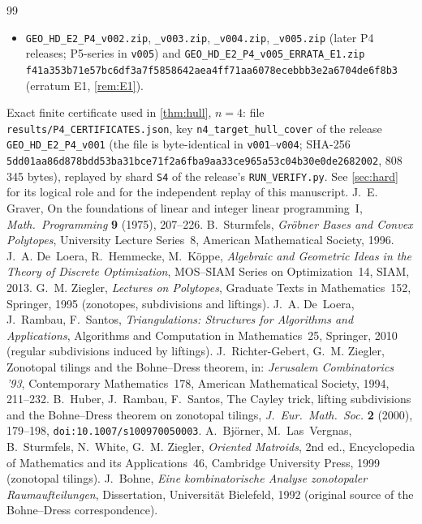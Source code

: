 \begin{thebibliography}{99}
\begin{itemize}[leftmargin=1.4em,itemsep=1pt,topsep=2pt]
\item\texttt{GEO\_HD\_E2\_P4\_v002.zip}, \texttt{\_v003.zip}, \texttt{\_v004.zip}, \texttt{\_v005.zip} (later P4 releases; P5-series in \texttt{v005}) and \texttt{GEO\_HD\_E2\_P4\_v005\_ERRATA\_E1.zip} \texttt{f41a353b71e57bc6df3a7f5858642aea4ff71aa6078ecebbb3e2a6704de6f8b3} (erratum E1, \cref{rem:E1}).
\end{itemize}
 Exact finite certificate used in \cref{thm:hull}, $n=4$: file \texttt{results/P4\_CERTIFICATES.json}, key \texttt{n4\_target\_hull\_cover} of the release \texttt{GEO\_HD\_E2\_P4\_v001} (the file is byte-identical in \texttt{v001}--\texttt{v004}; SHA-256 \texttt{5dd01aa86d878bdd53ba31bce71f2a6fba9aa33ce965a53c04b30e0de2682002}, 808\,345 bytes), replayed by shard \texttt{S4} of the release's \texttt{RUN\_VERIFY.py}. See \cref{sec:hard} for its logical role and for the independent replay of this manuscript.
 J.~E. Graver, On the foundations of linear and integer linear programming~I, \emph{Math.\ Programming} \textbf{9} (1975), 207--226.
 B.~Sturmfels, \emph{Gr\"obner Bases and Convex Polytopes}, University Lecture Series~8, American Mathematical Society, 1996.
 J.~A. De~Loera, R.~Hemmecke, M.~K\"oppe, \emph{Algebraic and Geometric Ideas in the Theory of Discrete Optimization}, MOS--SIAM Series on Optimization~14, SIAM, 2013.
 G.~M. Ziegler, \emph{Lectures on Polytopes}, Graduate Texts in Mathematics~152, Springer, 1995 (zonotopes, subdivisions and liftings).
 J.~A. De~Loera, J.~Rambau, F.~Santos, \emph{Triangulations: Structures for Algorithms and Applications}, Algorithms and Computation in Mathematics~25, Springer, 2010 (regular subdivisions induced by liftings).
 J.~Richter-Gebert, G.~M. Ziegler, Zonotopal tilings and the Bohne--Dress theorem, in: \emph{Jerusalem Combinatorics '93}, Contemporary Mathematics~178, American Mathematical Society, 1994, 211--232.
 B.~Huber, J.~Rambau, F.~Santos, The Cayley trick, lifting subdivisions and the Bohne--Dress theorem on zonotopal tilings, \emph{J.\ Eur.\ Math.\ Soc.} \textbf{2} (2000), 179--198, \texttt{doi:10.1007/s100970050003}.
 A.~Bj\"orner, M.~Las~Vergnas, B.~Sturmfels, N.~White, G.~M. Ziegler, \emph{Oriented Matroids}, 2nd ed., Encyclopedia of Mathematics and its Applications~46, Cambridge University Press, 1999 (zonotopal tilings).
 J.~Bohne, \emph{Eine kombinatorische Analyse zonotopaler Raumaufteilungen}, Dissertation, Universit\"at Bielefeld, 1992 (original source of the Bohne--Dress correspondence).
\end{thebibliography}
